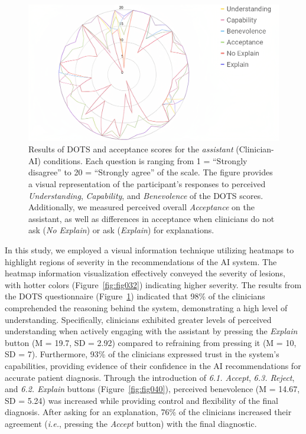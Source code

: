 \begin{figure}[htbp]
\centering
\includegraphics[width=\columnwidth]{images/fig111}
\caption{Results of DOTS and acceptance scores for the {\it assistant} (Clinician-AI) conditions. Each question is ranging from 1 = ``Strongly disagree'' to 20 = ``Strongly agree'' of the scale. The figure provides a visual representation of the participant's responses to perceived {\it Understanding}, {\it Capability}, and {\it Benevolence} of the DOTS scores. Additionally, we measured perceived overall {\it Acceptance} on the assistant, as well as differences in acceptance when clinicians do not ask ({\it No Explain}) or ask ({\it Explain}) for explanations.}
\label{fig:fig111}
\end{figure}

In this study, we employed a visual information technique utilizing heatmaps to highlight regions of severity in the recommendations of the \ac{AI} system.
The heatmap information visualization effectively conveyed the severity of lesions, with hotter colors (Figure~\ref{fig:fig032}) indicating higher severity.
The results from the \ac{DOTS} questionnaire (Figure~\ref{fig:fig111}) indicated that 98\% of the clinicians comprehended the reasoning behind the system, demonstrating a high level of understanding.
Specifically, clinicians exhibited greater levels of perceived understanding when actively engaging with the assistant by pressing the {\it Explain} button (M = 19.7, SD = 2.92) compared to refraining from pressing it (M = 10, SD = 7).
Furthermore, 93\% of the clinicians expressed trust in the system's capabilities, providing evidence of their confidence in the \ac{AI} recommendations for accurate patient diagnosis.
Through the introduction of {\it 6.1. Accept}, {\it 6.3. Reject}, and {\it 6.2. Explain} buttons (Figure~\ref{fig:fig040}), perceived benevolence (M = 14.67, SD = 5.24) was increased while providing control and flexibility of the final diagnosis.
After asking for an explanation, 76\% of the clinicians increased their agreement ({\it i.e.}, pressing the {\it Accept} button) with the final diagnostic.

